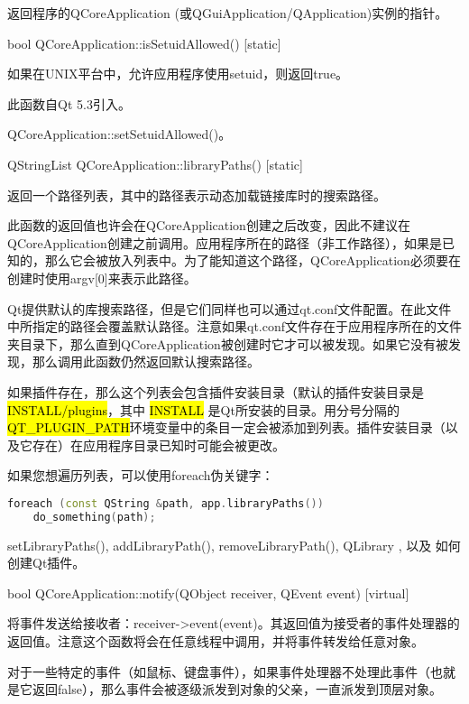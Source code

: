 返回程序的QCoreApplication (或QGuiApplication/QApplication)实例的指针。

bool QCoreApplication::isSetuidAllowed() [static]

如果在UNIX平台中，允许应用程序使用setuid，则返回true。

此函数自Qt 5.3引入。


\begin{seeAlso}
QCoreApplication::setSetuidAllowed()。
\end{seeAlso}

QStringList QCoreApplication::libraryPaths() [static]

返回一个路径列表，其中的路径表示动态加载链接库时的搜索路径。

此函数的返回值也许会在QCoreApplication创建之后改变，因此不建议在QCoreApplication创建之前调用。应用程序所在的路径（非工作路径），如果是已知的，那么它会被放入列表中。为了能知道这个路径，QCoreApplication必须要在创建时使用argv[0]来表示此路径。

Qt提供默认的库搜索路径，但是它们同样也可以通过qt.conf文件配置。在此文件中所指定的路径会覆盖默认路径。注意如果qt.conf文件存在于应用程序所在的文件夹目录下，那么直到QCoreApplication被创建时它才可以被发现。如果它没有被发现，那么调用此函数仍然返回默认搜索路径。

如果插件存在，那么这个列表会包含插件安装目录（默认的插件安装目录是
\hl{INSTALL/plugins}，其中 \hl{INSTALL} 是Qt所安装的目录。用分号分隔的\hl{QT\_PLUGIN\_PATH}环境变量中的条目一定会被添加到列表。插件安装目录（以及它存在）在应用程序目录已知时可能会被更改。

如果您想遍历列表，可以使用foreach伪关键字：

\begin{lstlisting}[language=C++]
foreach (const QString &path, app.libraryPaths())
    do_something(path);
\end{lstlisting}



\begin{seeAlso}
 setLibraryPaths(), addLibraryPath(), removeLibraryPath(), QLibrary , 以及 如何创建Qt插件。
\end{seeAlso}

bool QCoreApplication::notify(QObject receiver, QEvent event) [virtual]

将事件发送给接收者：receiver->event(event)。其返回值为接受者的事件处理器的返回值。注意这个函数将会在任意线程中调用，并将事件转发给任意对象。

对于一些特定的事件（如鼠标、键盘事件），如果事件处理器不处理此事件（也就是它返回false），那么事件会被逐级派发到对象的父亲，一直派发到顶层对象。

